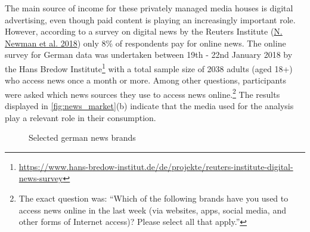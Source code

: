 \documentclass[
]{article}
\begin{document}
The main source of income for these privately managed media houses is
digital advertising, even though paid content is playing an increasingly
important role. However, according to a survey on digital news by the
Reuters Institute (\protect\hyperlink{ref-newman_reuters_2018}{N. Newman
et al. 2018}) only 8\% of respondents pay for online news. The online
survey for German data was undertaken between 19th - 22nd January 2018
by the Hans Bredow Institute\footnote{\url{https://www.hans-bredow-institut.de/de/projekte/reuters-institute-digital-news-survey}}
with a total sample size of 2038 adults (aged 18+) who access news once
a month or more. Among other questions, participants were asked which
news sources they use to access news online.\footnote{The exact question
  was: ``Which of the following brands have you used to access news
  online in the last week (via websites, apps, social media, and other
  forms of Internet access)? Please select all that apply.''} The
results displayed in \autoref{fig:news_market}(b) indicate that the
media used for the analysis play a relevant role in their consumption.

\begin{figure}

{\centering {}

}

\caption{Selected german news brands \label{fig:news_market}}\label{fig:unnamed-chunk-1}
\end{figure}
\end{document}
